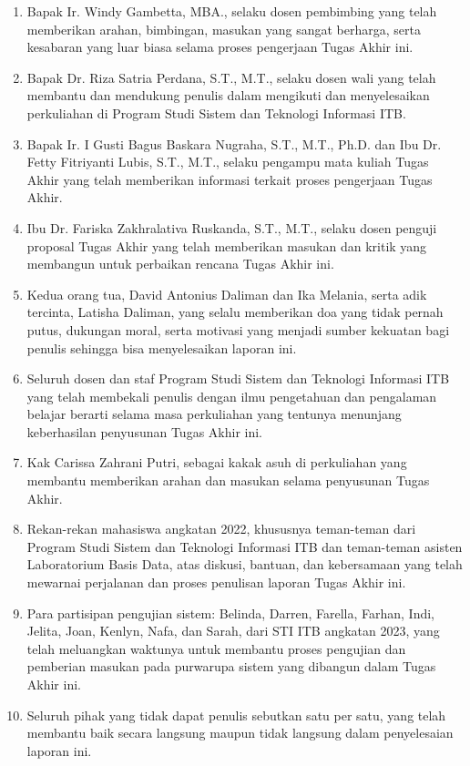 \begin{enumerate}
    \item Bapak Ir. Windy Gambetta, MBA., selaku dosen pembimbing yang telah memberikan arahan, bimbingan, masukan yang sangat berharga, serta kesabaran yang luar biasa selama proses pengerjaan Tugas Akhir ini.
    \item Bapak Dr. Riza Satria Perdana, S.T., M.T., selaku dosen wali yang telah membantu dan mendukung penulis dalam mengikuti dan menyelesaikan perkuliahan di Program Studi Sistem dan Teknologi Informasi ITB.
    \item Bapak Ir. I Gusti Bagus Baskara Nugraha, S.T., M.T., Ph.D. dan Ibu Dr. Fetty Fitriyanti Lubis, S.T., M.T., selaku pengampu mata kuliah Tugas Akhir yang telah memberikan informasi terkait proses pengerjaan Tugas Akhir.
    \item Ibu Dr. Fariska Zakhralativa Ruskanda, S.T., M.T., selaku dosen penguji proposal Tugas Akhir yang telah memberikan masukan dan kritik yang membangun untuk perbaikan rencana Tugas Akhir ini.
    \item Kedua orang tua, David Antonius Daliman dan Ika Melania, serta adik tercinta, Latisha Daliman, yang selalu memberikan doa yang tidak pernah putus, dukungan moral, serta motivasi yang menjadi sumber kekuatan bagi penulis sehingga bisa menyelesaikan laporan ini.
    \item Seluruh dosen dan staf Program Studi Sistem dan Teknologi Informasi ITB yang telah membekali penulis dengan ilmu pengetahuan dan pengalaman belajar berarti selama masa perkuliahan yang tentunya menunjang keberhasilan penyusunan Tugas Akhir ini.
    \item Kak Carissa Zahrani Putri, sebagai kakak asuh di perkuliahan yang membantu memberikan arahan dan masukan selama penyusunan Tugas Akhir.
    \item Rekan-rekan mahasiswa angkatan 2022, khususnya teman-teman dari Program Studi Sistem dan Teknologi Informasi ITB dan teman-teman asisten Laboratorium Basis Data, atas diskusi, bantuan, dan kebersamaan yang telah mewarnai perjalanan dan proses penulisan laporan Tugas Akhir ini.
    \item Para partisipan pengujian sistem: Belinda, Darren, Farella, Farhan, Indi, Jelita, Joan, Kenlyn, Nafa, dan Sarah, dari STI ITB angkatan 2023, yang telah meluangkan waktunya untuk membantu proses pengujian dan pemberian masukan pada purwarupa sistem yang dibangun dalam Tugas Akhir ini.
    \item Seluruh pihak yang tidak dapat penulis sebutkan satu per satu, yang telah membantu baik secara langsung maupun tidak langsung dalam penyelesaian laporan ini.
\end{enumerate}

